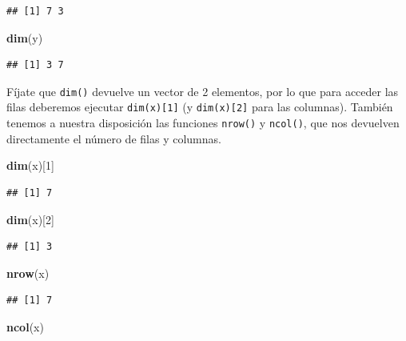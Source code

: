 \documentclass[11pt,]{book}
\newenvironment{Shaded}{\begin{snugshade}}{\end{snugshade}}
\newcommand{\DecValTok}[1]{\textcolor[rgb]{0.06,0.06,0.06}{#1}}
\newcommand{\KeywordTok}[1]{\textcolor[rgb]{0.27,0.27,0.27}{\textbf{#1}}}
\newcommand{\NormalTok}[1]{#1}
\begin{document}
\begin{verbatim}
## [1] 7 3
\end{verbatim}

\begin{Shaded}
\begin{Highlighting}[]
\KeywordTok{dim}\NormalTok{(y)}
\end{Highlighting}
\end{Shaded}

\begin{verbatim}
## [1] 3 7
\end{verbatim}

Fíjate que \texttt{dim()} devuelve un vector de 2 elementos, por lo que para acceder las filas deberemos ejecutar \texttt{dim(x){[}1{]}} (y \texttt{dim(x){[}2{]}} para las columnas). También tenemos a nuestra disposición las funciones \texttt{nrow()} y \texttt{ncol()}, que nos devuelven directamente el número de filas y columnas.

\begin{Shaded}
\begin{Highlighting}[]
\KeywordTok{dim}\NormalTok{(x)[}\DecValTok{1}\NormalTok{]}
\end{Highlighting}
\end{Shaded}

\begin{verbatim}
## [1] 7
\end{verbatim}

\begin{Shaded}
\begin{Highlighting}[]
\KeywordTok{dim}\NormalTok{(x)[}\DecValTok{2}\NormalTok{]}
\end{Highlighting}
\end{Shaded}

\begin{verbatim}
## [1] 3
\end{verbatim}

\begin{Shaded}
\begin{Highlighting}[]
\KeywordTok{nrow}\NormalTok{(x)}
\end{Highlighting}
\end{Shaded}

\begin{verbatim}
## [1] 7
\end{verbatim}

\begin{Shaded}
\begin{Highlighting}[]
\KeywordTok{ncol}\NormalTok{(x)}
\end{Highlighting}
\end{Shaded}
\end{document}
